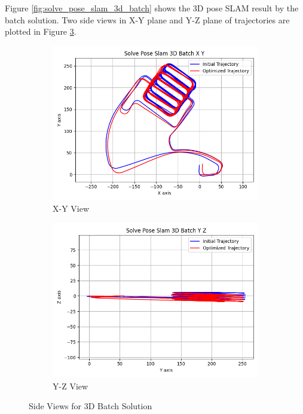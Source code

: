 \documentclass[11pt, oneside, letter]{article}
\begin{document}
\begin{enumerate}[A.]
Figure \ref{fig:solve_pose_slam_3d_batch} shows the 3D pose SLAM result by the batch solution. 
Two side views in X-Y plane and Y-Z plane of trajectories are plotted in Figure \ref{fig:solve_pose_slam_3d_batch_view}.

\begin{figure}[H]
    \centering
    \begin{subfigure}[b]{0.45\columnwidth}
        \centering
        \includegraphics[width=\columnwidth]{../figures/solve_pose_slam_3d_batch_x_y.png}
        \caption{X-Y View}
        \label{fig:solve_pose_slam_3d_batch_x_y}
    \end{subfigure}
    \begin{subfigure}[b]{0.45\columnwidth}
        \centering
        \includegraphics[width=\columnwidth]{../figures/solve_pose_slam_3d_batch_y_z.png}
        \caption{Y-Z View}
        \label{fig:solve_pose_slam_3d_batch_y_z}
    \end{subfigure}
    \caption{Side Views for 3D Batch Solution}
    \label{fig:solve_pose_slam_3d_batch_view}
\end{figure}


\end{enumerate}
\end{document}
